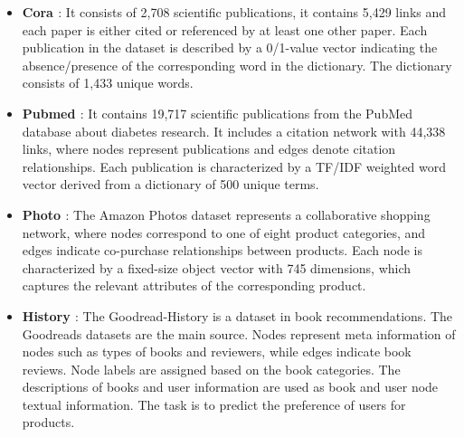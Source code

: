 \begin{itemize}
    \item \textbf{Cora \cite{McCallum2000}}: It consists of 2,708 scientific publications, it contains 5,429 links and each paper is either cited or referenced by at least one other paper. Each publication in the dataset is described by a 0/1-value vector indicating the absence/presence of the corresponding word in the dictionary. The dictionary consists of 1,433 unique words.
    \item \textbf{Pubmed \cite{Sen_Namata_Bilgic_Getoor_Galligher_Eliassi-Rad_2008}}: It contains 19,717 scientific publications from the PubMed database about diabetes research. It includes a citation network with 44,338 links, where nodes represent publications and edges denote citation relationships. Each publication is characterized by a TF/IDF weighted word vector derived from a dictionary of 500 unique terms.
    \item \textbf{Photo \cite{Shchur2018Pitfalls}}: The Amazon Photos dataset represents a collaborative shopping network, where nodes correspond to one of eight product categories, and edges indicate co-purchase relationships between products. Each node is characterized by a fixed-size object vector with 745 dimensions, which captures the relevant attributes of the corresponding product. 


    \item \textbf{History \citep{li2024tegdb}}: The Goodread-History is a dataset in book recommendations. The Goodreads datasets are the main source. Nodes represent meta information of nodes such as types of books and reviewers, while edges indicate book reviews. Node labels are assigned based on the book categories. The descriptions of books and user information are used as book and user node textual information. The task is to predict the preference of users for products.

\end{itemize}
 
